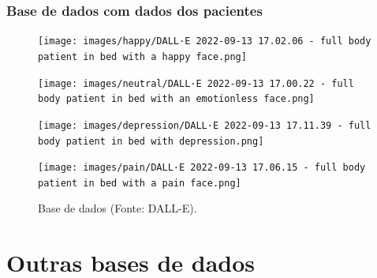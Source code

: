 \begin{frame}
    \frametitle{Base de dados com dados dos pacientes }
    \begin{figure}[!ht]
        \centering
        \caption{Base de dados (Fonte: DALL-E).}
        \begin{minipage}[t]{0.23\textwidth}
        \centering
          \texttt{[image: images/happy/DALL·E 2022-09-13 17.02.06 - full body patient in bed with a happy face.png]}
        \end{minipage}
        \hfill
        \begin{minipage}[t]{0.23\textwidth}
        \centering
          \texttt{[image: images/neutral/DALL·E 2022-09-13 17.00.22 - full body patient in bed with an emotionless face.png]}
        \end{minipage}
        \hfill
        \begin{minipage}[t]{0.23\textwidth}
        \centering
          \texttt{[image: images/depression/DALL·E 2022-09-13 17.11.39 - full body patient in bed with depression.png]}
        \end{minipage}
        \hfill
        \begin{minipage}[t]{0.23\textwidth}
        \centering
          \texttt{[image: images/pain/DALL·E 2022-09-13 17.06.15 - full body patient in bed with a pain face.png]}
        \end{minipage}
        \label{fig:patient:emotion}
      \end{figure}
    \end{frame}


\section{Outras bases de dados}


